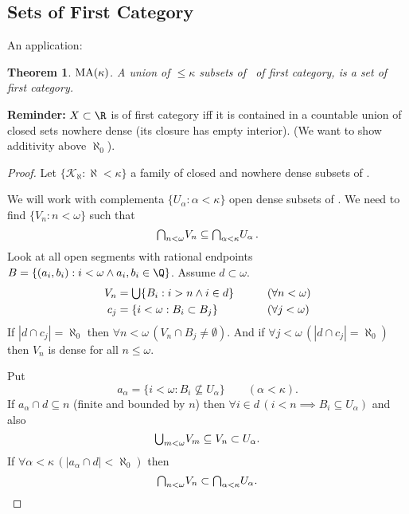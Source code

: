 \documentclass[11pt,pdftex,twoside,a4paper]{article}
\newcommand{\B}[1]{\textbf{#1}}
\newcommand{\MA}{\ensuremath{\mathop{\rm MA}\nolimits}}
\newtheorem{thm}{Theorem}[section]
\begin{document}
\subsection{Sets of First Category}

An application:
\begin{thm}
\(\MA(\kappa)\).
A union of \(\leq \kappa\) subsets of \R\ of first category, is a set of
first category.
\end{thm}
\B{Reminder:} \(X\subset\R\) is of first category iff
it is contained in a countable union of closed sets nowhere dense
(its closure has empty interior).
(We want to show additivity above \(\aleph_0\)).
\begin{proof}
Let \(\{\mathscr{K}_\aleph: \aleph < \kappa\}\) 
a family of closed and nowhere dense subsets of \R.
\iffalse
We need to find countable family of closed nowhere dense subsets
\(\{H_n: n < \omega\}\) such that
\begin{equation*}
\mathsmaller{\bigcup_{d<\kappa}} \mathscr{K}_d \subseteq 
  \mathsmaller{\bigcup_{n<\omega}} H_n.
\end{equation*}
\fi
We will work with complementa \(\{U_\alpha: \alpha<\kappa\}\)
open dense subsets of \R. We need to find \(\{V_n: n<\omega\}\)
such that 
\begin{equation*}
\mathsmaller{\bigcap_{n<\omega}} V_n \subseteq 
  \mathsmaller{\bigcap_{\alpha<\kappa}} U_\alpha\,.
\end{equation*}
Look at all open segments with rational endpoints
\(B=\{(a_i, b_i): i < \omega \land a_i,b_i \in \Q\}\).
Assume \(d\subset \omega\).
\begin{alignat*}{2}
V_n &= \mathsmaller{\bigcup} \{B_i: i > n \land i \in d\} 
  \qquad && (\forall n < \omega) \\
c_j &= \{i < \omega: B_i \subset B_j\}
  \qquad && (\forall j < \omega) \\
\end{alignat*}
If \(|d \cap c_j| = \aleph_0\) 
then \(\forall n < \omega\, (V_n \cap B_j \neq \emptyset)\).
And if \(\forall j < \omega\, (|d \cap c_j| = \aleph_0)\) 
then \(V_n\) is dense for all \(n \leq \omega\).

Put 
\begin{equation*}
a_\alpha = \{i < \omega: B_i \not\subseteq U_\alpha\} \qquad (\alpha < \kappa).
\end{equation*}
If \(a_\alpha \cap d \subseteq n\) (finite and bounded by $n$)
then \(\forall i\in d\,(i < n \implies B_i \subseteq U_\alpha)\)
and also 
\begin{equation*}
\mathsmaller{\bigcup_{m<\omega}} V_m \subseteq V_n \subset U_\alpha.
\end{equation*}
If \(\forall \alpha<\kappa\,(|a_\alpha \cap d|<\aleph_0)\)
then 
\begin{equation*}
\mathsmaller{\bigcap_{n<\omega}} V_n \subset
  \mathsmaller{\bigcap_{\alpha<\kappa}} U_\alpha .
\end{equation*}
\end{proof}
\end{document}
